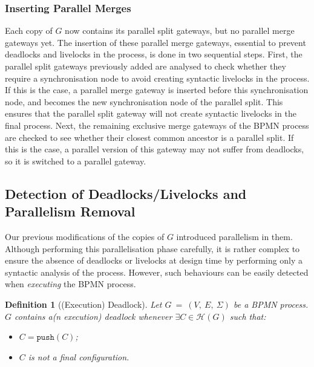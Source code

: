 \documentclass{article}
\newcommand*{\bpmnpargw}{\tikz[baseline=-.25em]{\node[shape=PF,draw,inner sep=0pt, minimum size=1.5em] (X) {};}}
\newcommand{\bpmnpargwmerge}{\ensuremath{\bpmnpargw_M}}
\newcommand{\bpmnpargwsplit}{\ensuremath{\bpmnpargw_S}}
\newcommand*{\bpmnxorgw}{\tikz[baseline=-.25em]{\node[shape=XOR,draw,inner sep=0pt, minimum size=1.5em] (X) {};}}
\newcommand{\bpmnxorgwmerge}{\ensuremath{\bpmnxorgw_M}}
\newcommand{\confset}[1]{\history(#1)}
\newcommand{\graph}{G~=~(V,~E,~\Sigma)}
\newcommand{\history}{\ensuremath{\mathcal{H}}}
\newcommand{\pushtokens}[1]{\ensuremath{\mathtt{push}(#1)}}
\newtheorem{definition}{Definition}
\newtheorem{remark}{Remark}
\begin{document}
	\begin{comment}
		\begin{remark}
			If a parallel split gateway $\bpmnpargwsplit$ is syntactically compliant but needs to be synchronised to avoid syntactic livelocks, then the necessary parallel merge gateway $\bpmnpargwmerge$ replaces the original exclusive merge gateway $\bpmnxorgwmerge$ present in $G$.
		\end{remark}
	\end{comment}
	
	\subsubsection{Inserting Parallel Merges}
	
	Each copy of $G$ now contains its parallel split gateways, but no parallel merge gateways yet.
	The insertion of these parallel merge gateways, essential to prevent deadlocks and livelocks in the process, is done in two sequential steps.
	First, the parallel split gateways previously added are analysed to check whether they require a synchronisation node to avoid creating syntactic livelocks in the process.
	If this is the case, a parallel merge gateway is inserted before this synchronisation node, and becomes the new synchronisation node of the parallel split.
	This ensures that the parallel split gateway will not create syntactic livelocks in the final process.
	Next, the remaining exclusive merge gateways of the BPMN process are checked to see whether their closest common ancestor is a parallel split.
	If this is the case, a parallel version of this gateway may not suffer from deadlocks, so it is switched to a parallel gateway.
	
	\subsection{Detection of Deadlocks/Livelocks and Parallelism Removal}
	
	Our previous modifications of the copies of $G$ introduced parallelism in them.
	Although performing this parallelisation phase carefully, it is rather complex to ensure the absence of deadlocks or livelocks at design time by performing only a syntactic analysis of the process.
	However, such behaviours can be easily detected when \textit{executing} the BPMN process.
	
	\begin{definition}[(Execution) Deadlock]
		Let $\graph$ be a BPMN process.
		$G$ contains \textnormal{a(n execution) deadlock} whenever $\exists C \in \confset{G}$ such that:
		
		\begin{itemize}
			\setlength\itemsep{-0.6em}
			\item[---] $C = \pushtokens{C}$;
			\item[---] $C$ is not a \textnormal{final configuration}.
		\end{itemize}
	\end{definition}
	
\end{document}
